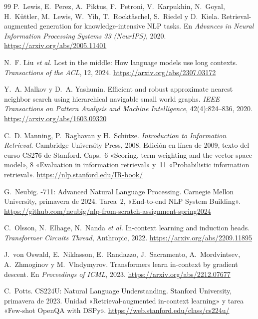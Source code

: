 \begin{thebibliography}{99}
P.~Lewis, E.~Perez, A.~Piktus, F.~Petroni, V.~Karpukhin, N.~Goyal, H.~Küttler, M.~Lewis, W.~Yih, T.~Rocktäschel, S.~Riedel y D.~Kiela.
\newblock Retrieval-augmented generation for knowledge-intensive NLP tasks.
\newblock En \emph{Advances in Neural Information Processing Systems 33 (NeurIPS)}, 2020.
\newblock \url{https://arxiv.org/abs/2005.11401}

N.~F. Liu \emph{et al.}
\newblock Lost in the middle: How language models use long contexts.
\newblock \emph{Transactions of the ACL}, 12, 2024.
\newblock \url{https://arxiv.org/abs/2307.03172}

Y.~A. Malkov y D.~A. Yashunin.
\newblock Efficient and robust approximate nearest neighbor search using hierarchical navigable small world graphs.
\newblock \emph{IEEE Transactions on Pattern Analysis and Machine Intelligence}, 42(4):824--836, 2020.
\newblock \url{https://arxiv.org/abs/1603.09320}

C.~D. Manning, P.~Raghavan y H.~Schütze.
\newblock \emph{Introduction to Information Retrieval}.
\newblock Cambridge University Press, 2008. Edición en línea de 2009, texto del curso CS276 de Stanford.
\newblock Caps.~6 «Scoring, term weighting and the vector space model», 8 «Evaluation in information retrieval» y~11 «Probabilistic information retrieval».
\newblock \url{https://nlp.stanford.edu/IR-book/}

G.~Neubig.
-711: Advanced Natural Language Processing.
\newblock Carnegie Mellon University, primavera de 2024. Tarea~2, «End-to-end NLP System Building».
\newblock \url{https://github.com/neubig/nlp-from-scratch-assignment-spring2024}

C.~Olsson, N.~Elhage, N.~Nanda \emph{et al.}
\newblock In-context learning and induction heads.
\newblock \emph{Transformer Circuits Thread}, Anthropic, 2022.
\newblock \url{https://arxiv.org/abs/2209.11895}

J.~von Oswald, E.~Niklasson, E.~Randazzo, J.~Sacramento, A.~Mordvintsev, A.~Zhmoginov y M.~Vladymyrov.
\newblock Transformers learn in-context by gradient descent.
\newblock En \emph{Proceedings of ICML}, 2023.
\newblock \url{https://arxiv.org/abs/2212.07677}

C.~Potts.
\newblock CS224U: Natural Language Understanding.
\newblock Stanford University, primavera de 2023. Unidad «Retrieval-augmented in-context learning» y tarea «Few-shot OpenQA with DSPy».
\newblock \url{https://web.stanford.edu/class/cs224u/}


\end{thebibliography}
